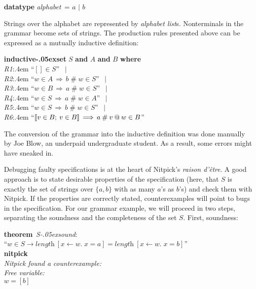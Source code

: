 \documentclass[a4paper,12pt]{article}
\renewcommand\_{\hbox{\textunderscore\kern-.05ex}}
\begin{document}
\prew
\textbf{datatype} \textit{alphabet}~= $a$ $\mid$ $b$
\postw

Strings over the alphabet are represented by \textit{alphabet list}s.
Nonterminals in the grammar become sets of strings. The production rules
presented above can be expressed as a mutually inductive definition:

\prew
\textbf{inductive\_set} $S$ \textbf{and} $A$ \textbf{and} $B$ \textbf{where} \\
\textit{R1}:\kern.4em ``$[] \in S$'' $\,\mid$ \\
\textit{R2}:\kern.4em ``$w \in A\,\Longrightarrow\, b \mathbin{\#} w \in S$'' $\,\mid$ \\
\textit{R3}:\kern.4em ``$w \in B\,\Longrightarrow\, a \mathbin{\#} w \in S$'' $\,\mid$ \\
\textit{R4}:\kern.4em ``$w \in S\,\Longrightarrow\, a \mathbin{\#} w \in A$'' $\,\mid$ \\
\textit{R5}:\kern.4em ``$w \in S\,\Longrightarrow\, b \mathbin{\#} w \in S$'' $\,\mid$ \\
\textit{R6}:\kern.4em ``$\mathopen{[\![} v \in B;\> v \in B\mathclose{]\!]} \,\Longrightarrow\, a \mathbin{\#} v \mathbin{@} w \in B$''
\postw

The conversion of the grammar into the inductive definition was done manually by
Joe Blow, an underpaid undergraduate student. As a result, some errors might
have sneaked in.

Debugging faulty specifications is at the heart of Nitpick's \textsl{raison
d'\^etre}. A good approach is to state desirable properties of the specification
(here, that $S$ is exactly the set of strings over $\{a, b\}$ with as many $a$'s
as $b$'s) and check them with Nitpick. If the properties are correctly stated,
counterexamples will point to bugs in the specification. For our grammar
example, we will proceed in two steps, separating the soundness and the
completeness of the set $S$. First, soundness:

\prew
\textbf{theorem}~\textit{S\_sound\/}: \\
``$w \in S \longrightarrow \textit{length}~[x\mathbin{\leftarrow} w.\; x = a] =
  \textit{length}~[x\mathbin{\leftarrow} w.\; x = b]$'' \\
\textbf{nitpick} \\[2\smallskipamount]
\slshape Nitpick found a counterexample: \\[2\smallskipamount]
\hbox{}\qquad Free variable: \nopagebreak \\
\hbox{}\qquad\qquad $w = [b]$
\postw
\end{document}
